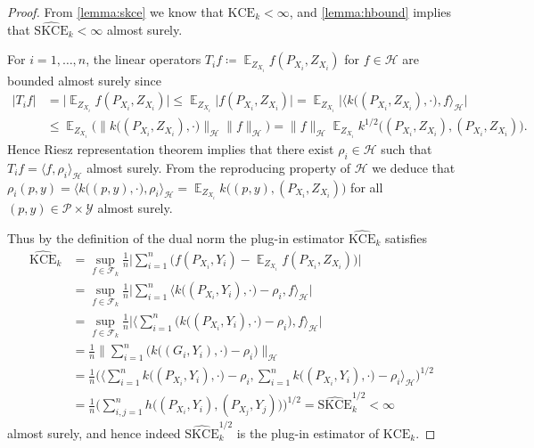 \documentclass{article}
\DeclareMathOperator{\Exp}{\mathbb{E}}
\begin{document}
\begin{proof}
From \cref{lemma:skce} we know that $\mathrm{KCE}_k < \infty$,
and \cref{lemma:hbound} implies that
$\widehat{\mathrm{SKCE}}_k < \infty$ almost surely.

For $i = 1,\ldots, n$, the linear operators
$T_i f \coloneqq \Exp_{Z_{X_i}} f(P_{X_i}, Z_{X_i})$ for
$f \in \mathcal{H}$ are bounded almost surely since
\begin{equation*}
    \begin{split}
        |T_i f| &= \big|\Exp_{Z_{X_i}} f(P_{X_i}, Z_{X_i}) \big| \leq \Exp_{Z_{X_i}} \big|f(P_{X_i}, Z_{X_i})\big| = \Exp_{Z_{X_i}} \big| \langle k\big((P_{X_i}, Z_{X_i}), \cdot\big), f \rangle_{\mathcal{H}}\big| \\
        &\leq \Exp_{Z_{X_i}} \bigg(\big\|k\big((P_{X_i}, Z_{X_i}), \cdot\big) \big\|_{\mathcal{H}} \|f\|_{\mathcal{H}}\bigg) = \|f\|_{\mathcal{H}} \Exp_{Z_{X_i}} k^{1/2}\big((P_{X_i}, Z_{X_i}), (P_{X_i}, Z_{X_i})\big).
    \end{split}
\end{equation*}
Hence Riesz representation theorem implies that there exist
$\rho_i \in \mathcal{H}$ such that $T_i f = \langle f, \rho_i \rangle_{\mathcal{H}}$
almost surely. From the reproducing property of $\mathcal{H}$
we deduce that
$\rho_i(p, y) = \langle k\big((p, y), \cdot\big), \rho_i \rangle_{\mathcal{H}} = \Exp_{Z_{X_i}} k\big((p, y), (P_{X_i}, Z_{X_i})\big)$ for all $(p, y) \in \mathcal{P} \times \mathcal{Y}$
almost surely.

Thus by the definition of the dual norm the plug-in estimator
$\widehat{\mathrm{KCE}}_k$ satisfies
\begin{equation*}
    \begin{split}
        \widehat{\mathrm{KCE}}_k &= \sup_{f \in \mathcal{F}_k} \frac{1}{n} \Bigg| \sum_{i=1}^n \big(f(P_{X_i}, Y_i) - \Exp_{Z_{X_i}} f(P_{X_i}, Z_{X_i}) \big) \Bigg| \\
        &= \sup_{f \in \mathcal{F}_k} \frac{1}{n} \Bigg| \sum_{i=1}^n \big\langle k\big((P_{X_i}, Y_i), \cdot\big) - \rho_i, f \big\rangle_{\mathcal{H}} \Bigg| \\
        &= \sup_{f \in \mathcal{F}_k} \frac{1}{n} \Bigg| \bigg\langle \sum_{i=1}^n \big(k\big((P_{X_i}, Y_i), \cdot\big) - \rho_i\big), f \bigg\rangle_{\mathcal{H}} \Bigg|\\
        &= \frac{1}{n} \Bigg\| \sum_{i=1}^n \bigg(k\big((G_i, Y_i), \cdot\big) - \rho_i\bigg) \Bigg\|_{\mathcal{H}} \\
        &= \frac{1}{n} \Bigg(\bigg\langle \sum_{i=1}^n k\big((P_{X_i}, Y_i), \cdot\big) - \rho_i, \sum_{i=1}^n k\big((P_{X_i}, Y_i), \cdot\big) - \rho_i \bigg\rangle_{\mathcal{H}}\Bigg)^{1/2} \\
        &= \frac{1}{n} \Bigg(\sum_{i,j=1}^n h\big((P_{X_i}, Y_i), (P_{X_j}, Y_j)\big)\Bigg)^{1/2}
        = \widehat{\mathrm{SKCE}}^{1/2}_k < \infty
    \end{split}
\end{equation*}
almost surely, and hence indeed
$\widehat{\mathrm{SKCE}}_k^{1/2}$ is the plug-in
estimator of $\mathrm{KCE}_k$.


\end{proof}
\end{document}
